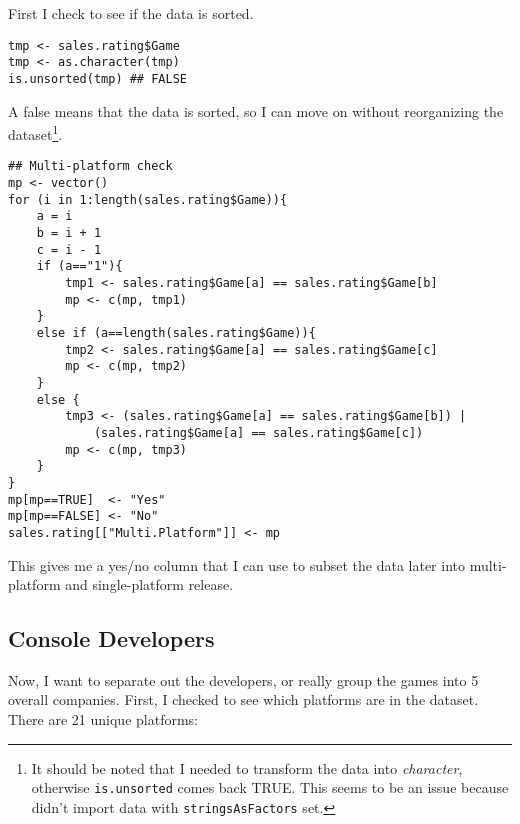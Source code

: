 First I check to see if the data is sorted.

\begin{verbatim}
tmp <- sales.rating$Game
tmp <- as.character(tmp)
is.unsorted(tmp) ## FALSE
\end{verbatim}
A false means that the data is sorted, so I can move on without reorganizing the dataset\footnote{It should be noted that I needed to transform the data into \emph{character}, otherwise \texttt{is.unsorted} comes back TRUE. This seems to be an issue because didn't import data with \texttt{stringsAsFactors} set.}.

\begin{verbatim}
## Multi-platform check
mp <- vector()
for (i in 1:length(sales.rating$Game)){
    a = i
    b = i + 1
    c = i - 1
    if (a=="1"){
        tmp1 <- sales.rating$Game[a] == sales.rating$Game[b]
        mp <- c(mp, tmp1)
    }
    else if (a==length(sales.rating$Game)){
        tmp2 <- sales.rating$Game[a] == sales.rating$Game[c]
        mp <- c(mp, tmp2)
    }
    else {
        tmp3 <- (sales.rating$Game[a] == sales.rating$Game[b]) |
            (sales.rating$Game[a] == sales.rating$Game[c])
        mp <- c(mp, tmp3)
    }
}
mp[mp==TRUE]  <- "Yes"
mp[mp==FALSE] <- "No"
sales.rating[["Multi.Platform"]] <- mp
\end{verbatim}
This gives me a yes/no column that I can use to subset the data later into multi-platform and single-platform release.

\subsection{Console Developers}
Now, I want to separate out the developers, or really group the games into 5 overall companies. First, I checked to see which platforms are in the dataset. There are 21 unique platforms:

